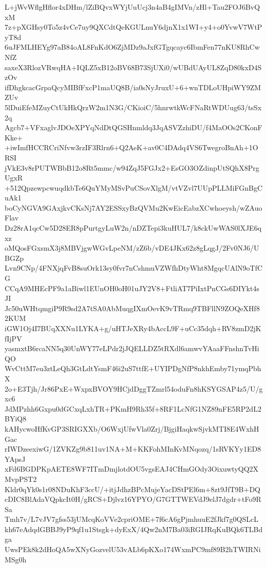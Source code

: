 L+jWvWflgHflor4xDHm/lZiBQvxWYjUuUcj3n4aB4gIMVn/zHl+Tau2FOJ6BvQxM
7z+pXGHsy0To5z4vCe7uy9QXCdtQeKGULnuY6djnX1x1WI+y4+o0YvwV7WtPyT8d
6uJFMLHEYg97aB84oAL8FnKdO6ZjMDz9aJxfGTgqcayc6IbmFen77nKU8RhCwNfZ
saxeX3RlozVRwqHA+IQLZ5xB12oBV68B73SjUXi0/wUBdUAyUL8ZqD80kxD4SzOv
ifDhgkcacGrpaQcyMIBfFxcP1maUQ8B/ia0sNyJruxU+6+wnTDLoUHpiWY9ZMZUv
5lDuiEfeMZuyCtUkHkQrzW2m1N3G/CKioiC/5hnrwtkWcFNaRtWDUug63/tsSx2q
Agcb7+VFxaglvJDOeXPYqNdDtQGSHnmldq3JqASVZzhiDU/f4MaOOs2CKonFKke+
+iwImfHCCRCriNfvw3rzIF3Rlrn6+Q2AeK+av0C4DAdq4VS6TwegroBnAh+1ORSI
jVkE3v8rPUTWBbB12o8Rt5mmc/w94ZqJ5FGJx2+EsGO3OZdinpUtSQhX8PrgUgxR
+512QpzewpcwuqdkbTe6QuYMyMSvPuCSovXlgM/vtVZvl7UUpPLLMiFGnBgCuAk1
boCyNGVA9GAxjkvCKsNj7AY2ESSxyBzQVMu2KwEicEabzXCwhoeysh/wZAuoFlav
Dz28rA1qcCw5D28ER8pPurtgyLuW2n/nDZTepi3kuHUL7/k8ckUwWAS0lXJE6qxz
oMQosFGxsmX3j8MBVjgwWGvLpeNM/zZ6b/vDE4JKx62z8gLqgJ/2Fv0NJ6/UBGZp
Lvn9CNp/4FNXjqFvB8suOrk13sy0fvr7nCshmuVZWfhDtyWht8MgqcUAlN9oTfCG
CCqA9MHEcPF9a1aBiwl1EUnOH0oH01uJY2V8+FtliAT7PiIxtPnCGs6DIYkt4sJI
Jc50uWHtqmgiP9R9sd2A7tSA0AbMuqgIXmOevK9vTRmq9TBFllN9ZOQeXHf82KUM
iGW1Oj4I7BUqXXNu1LYKA+g/uHTJeXRy4bAccL9F+uCc35dqh+RV8zmD2jKfIjPV
yasmxtB6rcaNN5q30UnWY77eLPdr2jJQELLDZ5tRXdl6amwvYAaaFFnshnTvHiQO
WvCttM7eu3ztLeQh3GtLdtYsmF46i2uS7ttfE+UYIPDgNfP8nkhEmby71ymqPbhX
2o+E3Tjh/Jr86PxE+WxpxBVOY9HCjdDggTZmrl54oduFn8hKSYGSAP4z5/U/gxc6
JdMPzhh6Gxpu0dGCxqLxhTR+PKmH9Rh35f+8RF1LcNfG1NZ89nFE5RP2dL2BYiQ8
kAHycwoHfKvGP3SRIGXXb/O6WxjUfwVla0Zrj/BjgiHaqkwSjvkMTI8E4WxhHGac
rIWDzeexiwG/1ZVKZg9b811uv1NA+M+KKFohMInKvMNqozq/1sRVKYy1ED8YApsJ
xFd6BGDPKpAETE8WF7ITmDmjlotdOU5vgsEAJ4CHmGOdy3OixuwtyQQ2XMvpPST2
Kldr0qYk0s1r08NDuKhF3ccU/+itjJdhzBPcMujeYacDStPEl6m+8zt9JfT9B+DQ
cDIC8BlAdaVQpkcIt0H/gRCS+Djlvz16YPYO/G7GTTWEVdJ9elJ7dgdr+tFo9RSa
Tmh7v/L7vJV7gfss53jUMcqKoVVe2cpriOME+7f6cA6gPjmhuuE2fJkf7g0QSLcL
kh67eAdqdGBBJ9yP9qf1u1Stsgk+dyExX/4Qw2nM7Ba03iRGIJRqKuBQk6TLBdga
UwsPEk8k2dHoQA5wXNyGozvelU53vALb6pKXo174WxmPC9mf89B2hTWIRNiMSg0h
